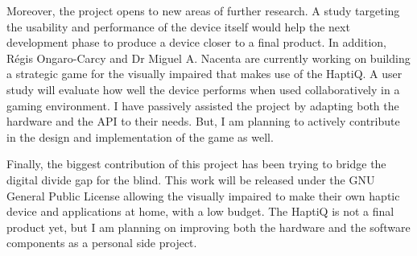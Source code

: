 Moreover, the project opens to new areas of further research. A study targeting the usability and performance of the device itself would help the next development phase to produce a device closer to a final product. In addition, Régis Ongaro-Carcy and Dr Miguel A. Nacenta are currently working on building a strategic game for the visually impaired that makes use of the HaptiQ. A user study will evaluate how well the device performs when used collaboratively in a gaming environment. I have passively assisted the project by adapting both the hardware and the API to their needs. But, I am planning to actively contribute in the design and implementation of the game as well. 

Finally, the biggest contribution of this project has been trying to bridge the digital divide gap for the blind. This work will be released under the GNU General Public License allowing the visually impaired to make their own haptic device and applications at home, with a low budget. The HaptiQ is not a final product yet, but I am planning on improving both the hardware and the software components as a personal side project.

